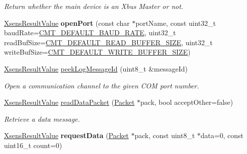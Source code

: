 \begin{DoxyCompactItemize}
\begin{DoxyCompactList}\small\item\em \-Return whether the main device is an \-Xbus \-Master or not. \end{DoxyCompactList}\item 
\hypertarget{classxsens_1_1Cmt3_a51d6f626b99cc3b53b0ab962fa6e1f19}{\hyperlink{group__enums_ga822a2260a20af524029eef9e9a51ff6f}{\-Xsens\-Result\-Value} {\bfseries open\-Port} (const char $\ast$port\-Name, const uint32\-\_\-t baud\-Rate=\hyperlink{cmtdef_8h_a56b1b182fb05cb2746c0a29ab5bae7ed}{\-C\-M\-T\-\_\-\-D\-E\-F\-A\-U\-L\-T\-\_\-\-B\-A\-U\-D\-\_\-\-R\-A\-T\-E}, uint32\-\_\-t read\-Buf\-Size=\hyperlink{cmtdef_8h_a59c570baa7aed9a7ca80039ea2eddef7}{\-C\-M\-T\-\_\-\-D\-E\-F\-A\-U\-L\-T\-\_\-\-R\-E\-A\-D\-\_\-\-B\-U\-F\-F\-E\-R\-\_\-\-S\-I\-Z\-E}, uint32\-\_\-t write\-Buf\-Size=\hyperlink{cmtdef_8h_aa23bbf277ce62aa44a107c5c873d0dcd}{\-C\-M\-T\-\_\-\-D\-E\-F\-A\-U\-L\-T\-\_\-\-W\-R\-I\-T\-E\-\_\-\-B\-U\-F\-F\-E\-R\-\_\-\-S\-I\-Z\-E})}\label{classxsens_1_1Cmt3_a51d6f626b99cc3b53b0ab962fa6e1f19}

\item 
\hyperlink{group__enums_ga822a2260a20af524029eef9e9a51ff6f}{\-Xsens\-Result\-Value} \hyperlink{classxsens_1_1Cmt3_a795faa0d01a9993821e2182b38725657}{peek\-Log\-Message\-Id} (uint8\-\_\-t \&message\-Id)
\begin{DoxyCompactList}\small\item\em \-Open a communication channel to the given \-C\-O\-M port number. \end{DoxyCompactList}\item 
\hyperlink{group__enums_ga822a2260a20af524029eef9e9a51ff6f}{\-Xsens\-Result\-Value} \hyperlink{classxsens_1_1Cmt3_aa83427cb2e2e41e14a22073e19be6d59}{read\-Data\-Packet} (\hyperlink{classxsens_1_1Packet}{\-Packet} $\ast$pack, bool accept\-Other=false)
\begin{DoxyCompactList}\small\item\em \-Retrieve a data message. \end{DoxyCompactList}\item 
\hypertarget{classxsens_1_1Cmt3_a755acf7865acee0bbb4b66d2342bd925}{\hyperlink{group__enums_ga822a2260a20af524029eef9e9a51ff6f}{\-Xsens\-Result\-Value} {\bfseries request\-Data} (\hyperlink{classxsens_1_1Packet}{\-Packet} $\ast$pack, const uint8\-\_\-t $\ast$data=0, const uint16\-\_\-t count=0)}\label{classxsens_1_1Cmt3_a755acf7865acee0bbb4b66d2342bd925}


\end{DoxyCompactItemize}
